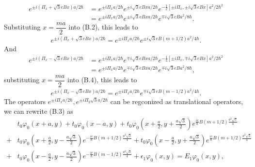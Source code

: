 \documentclass{report}
\newcommand{\f}[2]{\dfrac{#1}{#2}}
\begin{document}
\begin{equation}
	\begin{aligned}
		e^{\pm i(\Pi_{x} + \sqrt{3} e B x) a / 2\hbar}
		 & = e^{\pm i \Pi_{x} a / 2 \hbar} e^{\pm i\sqrt{3} e B x a / 2 \hbar} e^{-\frac{1}{2} \left[\pm i \Pi_{x}, \pm i \sqrt{3} e B x\right] a^{2} / 2 \hbar^{2}} \\
		 & = e^{\pm i \Pi_{x} a / 2 \hbar} e^{\pm i\sqrt{3} e B x a / 2 \hbar} e^{\mp i \sqrt{3} e B a^{2} / 8 \hbar}.
	\end{aligned}
\end{equation}
Substituting $x = \f{ma}{2}$ into (B.2), this leads to
\begin{gather}
	e^{\pm i(\Pi_{x} + \sqrt{3} e B x) a / 2\hbar}
	= e^{\pm i \Pi_{x} a / 2 \hbar} e^{\pm i\sqrt{3} e B (m + 1 /2) a^{2} / 4 \hbar}.
\end{gather}
And
\begin{equation}
	\begin{aligned}
		e^{\pm i(\Pi_{x} - \sqrt{3} e B x) a / 2\hbar}
		 & = e^{\pm i \Pi_{x} a / 2 \hbar} e^{\mp i\sqrt{3} e B x a / 2 \hbar} e^{-\frac{1}{2} \left[\pm i \Pi_{x}, \mp i \sqrt{3} e B x\right] a^{2} / 2 \hbar^{2}} \\
		 & = e^{\pm i \Pi_{x} a / 2 \hbar} e^{\mp i\sqrt{3} e B x a / 2 \hbar} e^{\mp i \sqrt{3} e B a^{2} / 8 \hbar},
	\end{aligned}
\end{equation}
substituting $x = \f{ma}{2}$ into (B.4), this leads to
\begin{gather}
	e^{\pm i(\Pi_{x} - \sqrt{3} e B x) a / 2\hbar}
	= e^{\pm i \Pi_{x} a / 2 \hbar} e^{\mp i\sqrt{3} e B (m - 1 /2) a^{2} / 4 \hbar}.
\end{gather}
The operators $e^{\pm i \Pi_{x} a / 2 \hbar}, e^{\pm i \Pi_{y} \sqrt{3}a / 2 \hbar}$ can be regconized as translational operators, we can rewrite (B.3) as
\begin{equation}
	\begin{aligned}
		  & t_{0} \varphi_{0} (x + a,y) + t_{0}\varphi_{0} (x - a,y) + t_{0}\varphi_{0} (x + \frac{a}{2},y + \frac{a\sqrt{3}}{2}) e^{\frac{ie}{\hbar}B(m + 1 /2) \frac{a^{2}\sqrt{3}}{4}}                                                            \\
		+ & t_{0} \varphi_{0} (x + \frac{a}{2},y - \frac{a\sqrt{3}}{2}) e^{-\frac{ie}{\hbar}B(m + 1/2) \frac{a^{2}\sqrt{3}}{4}} + t_{0} \varphi_{0} (x - \frac{a}{2},y + \frac{a\sqrt{3}}{2}) e^{\frac{ie}{\hbar}B(m + 1/2) \frac{a^{2}\sqrt{3}}{4}} \\
		+ & t_{0} \varphi_{0} (x - \frac{a}{2},y - \frac{a\sqrt{3}}{2}) e^{-\frac{ie}{\hbar}B(m - 1/2) \frac{a^{2}\sqrt{3}}{4}} + \epsilon_{1} \varphi_{0}(x,y) = E_{1} \varphi_{0}(x,y),
	\end{aligned}
\end{equation}
\end{document}
